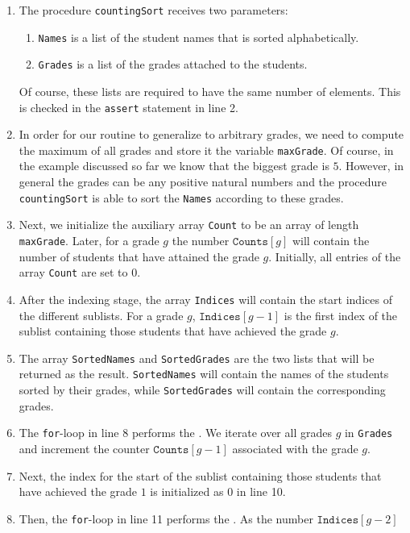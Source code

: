 \begin{enumerate}
\item The procedure \texttt{countingSort} receives two parameters:
      \begin{enumerate}
      \item \texttt{Names} is a list of the student names that is sorted alphabetically.
      \item \texttt{Grades} is a list of the grades attached to the students.
      \end{enumerate}
      Of course, these lists are required to have the same number of elements.  This is checked in the
      \texttt{assert} statement in line 2.
\item In order for our routine to generalize to arbitrary grades, we need to compute the maximum of all grades
      and store it the variable \texttt{maxGrade}.  Of course, in the example discussed so far we know that the biggest
      grade is $5$.  However, in general the grades can be any positive natural numbers and the procedure \texttt{countingSort}
      is able to sort the \texttt{Names} according to these grades.  
\item Next, we initialize the auxiliary array \texttt{Count} to be an array of length \texttt{maxGrade}.
      Later, for a grade $g$ the number $\texttt{Counts}[g]$ will contain the number of students that have
      attained the grade $g$.  Initially, all entries of the array \texttt{Count} are set to $0$.
\item After the indexing stage, the array \texttt{Indices} will contain the start indices of the different sublists.
      For a grade $g$, $\texttt{Indices}[g-1]$ is the first index of the sublist containing those students that
      have achieved the grade $g$.
\item The array \texttt{SortedNames} and \texttt{SortedGrades} are the two lists that will be returned as the
      result.  \texttt{SortedNames} will contain the names of the students sorted by their grades, while
      \texttt{SortedGrades} will contain the corresponding grades. 
\item The \texttt{for}-loop in line 8 performs the .  We iterate over all grades $g$ in
      \texttt{Grades} and increment the counter $\texttt{Counts}[g-1]$ associated with the grade $g$.
\item Next, the index for the start of the sublist containing those students that have achieved the grade $1$
      is initialized as $0$ in line 10. 
\item Then, the \texttt{for}-loop in line 11 performs the . As the number $\texttt{Indices}[g-2]$

\end{enumerate}

